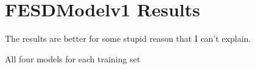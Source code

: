 \section{FESDModelv1 Results}
\label{sec:FESDModelv1_results}

The results are better for some stupid reason that I can't explain.

All four models for each training set 